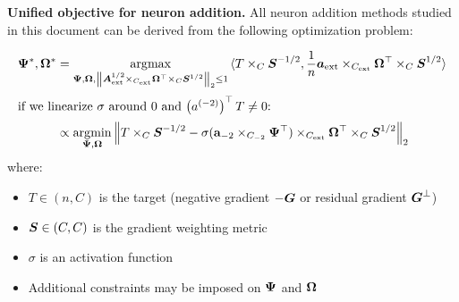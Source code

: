 \begin{theorem}\label{thm:unified_objective}

\textbf{Unified objective for neuron addition.} All neuron addition
methods studied in this document can be derived from the following
optimization problem:

\begin{subequations}\label{eq:unified_objective}
\begin{align}
\Fanin{}^{\ast},\Fanout{}^{\ast} & = \argmax_{\Fanin{},\Fanout{},\left\| {\sqrtAext \times_{\cext}\Fanout{}^{\top} \times_{C}\sqrtS} \right\|_{2} \leq 1}{\langle T \times_{C}\isqrtS,\frac{1}{n}\Postactext \times_{\cext}\Fanout{}^{\top} \times_{C}\sqrtS\rangle} \label{eq:unified_objective_scalarp} \\
\shortintertext{if we linearize $\sigma$ around $0$ and $\transp{\postact[-2]}T \neq 0$:}
 & \propto \argmin_{\Fanin{},\Fanout{}}\left\| {T \times_{C}\isqrtS - \sigma(\mathbf{a}_{- 2} \times_{C_{- 2}}\Fanin{}^{\top}) \times_{\cext}\Fanout{}^{\top} \times_{C}\sqrtS} \right\|_{2} \label{eq:unified_objective_norm}
\end{align}
\end{subequations}
where:
\begin{itemize}
\item
  \(T \in (n,C)\) is the target (negative gradient \(- \Gradpreact\) or
  residual gradient \({\Bottleneck}\))
\item
  \(\covgrad \in (C,C)\) is the gradient weighting metric
\item
  \(\sigma\) is an activation function
\item
  Additional constraints may be imposed on \(\Fanin{}\) and
  \(\Fanout{}\)
\end{itemize}


\end{theorem}
